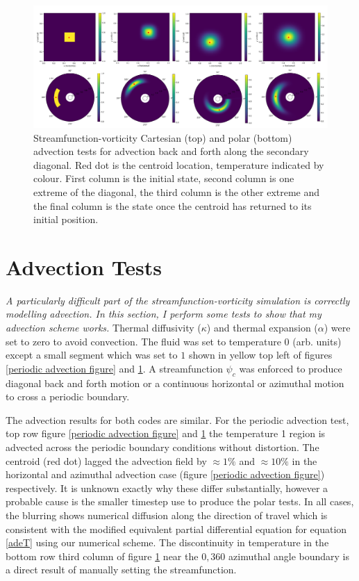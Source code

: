 \documentclass{article}
\begin{document}
\begin{figure}
	\center
	\includegraphics[scale=1.20]{combinedDiagonal.png}
	\caption{Streamfunction-vorticity Cartesian (top) and polar (bottom) advection tests for advection back and forth along the secondary diagonal. Red dot is the centroid location, temperature indicated by colour. First column is the initial state, second column is one extreme of the diagonal, the third column is the other extreme and the final column is the state once the centroid has returned to its initial position.}
	\label{diagonal advection figure}
\end{figure}

\newpage
\section*{Advection Tests}
{\it{A particularly difficult part of the streamfunction-vorticity simulation is correctly modelling advection. In this section, I perform some tests to show that my advection scheme works.}}
\vspace{0.3cm}
\newline
\noindent Thermal diffusivity ($\kappa$) and thermal expansion ($\alpha$) were set to zero to avoid convection. The fluid was set to temperature 0 (arb. units) except a small segment which was set to $1$ shown in yellow top left of figures \ref{periodic advection figure} and \ref{diagonal advection figure}. A streamfunction $\psi_c$ was enforced to produce diagonal back and forth motion or a continuous horizontal or azimuthal motion to cross a periodic boundary.




\noindent The advection results for both codes are similar. For the periodic advection test, top row figure \ref{periodic advection figure} and \ref{diagonal advection figure} the temperature 1 region is advected across the periodic boundary conditions without distortion. The centroid (red dot) lagged the advection field by $\approx 1 \%$ and $\approx 10 \%$ in the horizontal and azimuthal advection case (figure \ref{periodic advection figure}) respectively. It is unknown exactly why these differ substantially, however a probable cause is the smaller timestep use to produce the polar tests. In all cases, the blurring shows numerical diffusion along the direction of travel which is consistent with the modified equivalent partial differential equation for equation \ref{adeT} using our numerical scheme. The discontinuity in temperature in the bottom row third column of figure \ref{diagonal advection figure} near the $0, 360$ azimuthal angle boundary is a direct result of manually setting the streamfunction.
\end{document}
